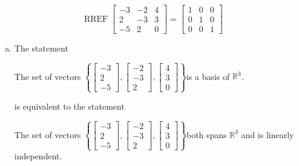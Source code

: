 \begin{exerciseAnswer} 


\[\operatorname{RREF} \left[\begin{array}{ccc}
-3 & -2 & 4 \\
2 & -3 & 3 \\
-5 & 2 & 0
\end{array}\right] = \left[\begin{array}{ccc}
1 & 0 & 0 \\
0 & 1 & 0 \\
0 & 0 & 1
\end{array}\right] \]


\begin{enumerate}[(a)]
\item The statement 
\begin{center}\begin{minipage}{0.8\textwidth}
 The set of vectors \( \left\{ \left[\begin{array}{c}
-3 \\
2 \\
-5
\end{array}\right] , \left[\begin{array}{c}
-2 \\
-3 \\
2
\end{array}\right] , \left[\begin{array}{c}
4 \\
3 \\
0
\end{array}\right] \right\} \)is a basis of \(\mathbb{R}^3\). 
\end{minipage}\end{center}
     is equivalent to the statement 
\begin{center}\begin{minipage}{0.8\textwidth}
 The set of vectors \( \left\{ \left[\begin{array}{c}
-3 \\
2 \\
-5
\end{array}\right] , \left[\begin{array}{c}
-2 \\
-3 \\
2
\end{array}\right] , \left[\begin{array}{c}
4 \\
3 \\
0
\end{array}\right] \right\} \)both spans \(\mathbb{R}^3\) and is linearly independent.
\end{minipage}\end{center}
    

\end{enumerate}
\end{exerciseAnswer}
